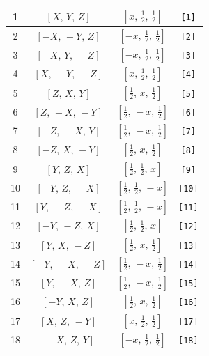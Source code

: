 \documentclass[fleqn,8pt]{jsarticle}
\begin{document}
\begin{longtable}{cccc}
1 & $\left[ X,\, Y,\, Z \right]$ & $\left[ x,\, \frac{1}{2},\, \frac{1}{2} \right]$ & {\tt [1]} \\ \hline
2 & $\left[ - X,\, - Y,\, Z \right]$ & $\left[ - x,\, \frac{1}{2},\, \frac{1}{2} \right]$ & {\tt [2]} \\ \hline
3 & $\left[ - X,\, Y,\, - Z \right]$ & $\left[ - x,\, \frac{1}{2},\, \frac{1}{2} \right]$ & {\tt [3]} \\ \hline
4 & $\left[ X,\, - Y,\, - Z \right]$ & $\left[ x,\, \frac{1}{2},\, \frac{1}{2} \right]$ & {\tt [4]} \\ \hline
5 & $\left[ Z,\, X,\, Y \right]$ & $\left[ \frac{1}{2},\, x,\, \frac{1}{2} \right]$ & {\tt [5]} \\ \hline
6 & $\left[ Z,\, - X,\, - Y \right]$ & $\left[ \frac{1}{2},\, - x,\, \frac{1}{2} \right]$ & {\tt [6]} \\ \hline
7 & $\left[ - Z,\, - X,\, Y \right]$ & $\left[ \frac{1}{2},\, - x,\, \frac{1}{2} \right]$ & {\tt [7]} \\ \hline
8 & $\left[ - Z,\, X,\, - Y \right]$ & $\left[ \frac{1}{2},\, x,\, \frac{1}{2} \right]$ & {\tt [8]} \\ \hline
9 & $\left[ Y,\, Z,\, X \right]$ & $\left[ \frac{1}{2},\, \frac{1}{2},\, x \right]$ & {\tt [9]} \\ \hline
10 & $\left[ - Y,\, Z,\, - X \right]$ & $\left[ \frac{1}{2},\, \frac{1}{2},\, - x \right]$ & {\tt [10]} \\ \hline
11 & $\left[ Y,\, - Z,\, - X \right]$ & $\left[ \frac{1}{2},\, \frac{1}{2},\, - x \right]$ & {\tt [11]} \\ \hline
12 & $\left[ - Y,\, - Z,\, X \right]$ & $\left[ \frac{1}{2},\, \frac{1}{2},\, x \right]$ & {\tt [12]} \\ \hline
13 & $\left[ Y,\, X,\, - Z \right]$ & $\left[ \frac{1}{2},\, x,\, \frac{1}{2} \right]$ & {\tt [13]} \\ \hline
14 & $\left[ - Y,\, - X,\, - Z \right]$ & $\left[ \frac{1}{2},\, - x,\, \frac{1}{2} \right]$ & {\tt [14]} \\ \hline
15 & $\left[ Y,\, - X,\, Z \right]$ & $\left[ \frac{1}{2},\, - x,\, \frac{1}{2} \right]$ & {\tt [15]} \\ \hline
16 & $\left[ - Y,\, X,\, Z \right]$ & $\left[ \frac{1}{2},\, x,\, \frac{1}{2} \right]$ & {\tt [16]} \\ \hline
17 & $\left[ X,\, Z,\, - Y \right]$ & $\left[ x,\, \frac{1}{2},\, \frac{1}{2} \right]$ & {\tt [17]} \\ \hline
18 & $\left[ - X,\, Z,\, Y \right]$ & $\left[ - x,\, \frac{1}{2},\, \frac{1}{2} \right]$ & {\tt [18]} \\ \hline

\end{longtable}
\end{document}
